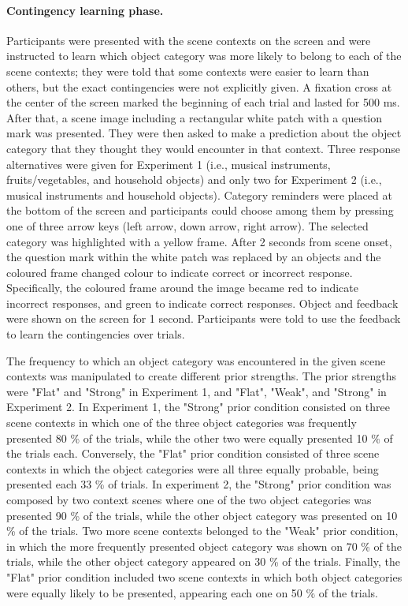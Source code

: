 \documentclass[a4paper,12pt]{article}
\begin{document}
\paragraph{Contingency learning phase.}
Participants were presented with the scene contexts on the screen and were instructed to learn which object category was more likely to belong to each of the scene contexts; they were told that some contexts were easier to learn than others, but the exact contingencies were not explicitly given. A fixation cross at the center of the screen marked the beginning of each trial and lasted for 500 ms. After that, a scene image including a rectangular white patch with a question mark was presented. They were then asked to make a prediction about the object category that they thought they would encounter in that context. Three response alternatives were given for Experiment 1 (i.e., musical instruments, fruits/vegetables, and household objects) and only two for Experiment 2 (i.e., musical instruments and household objects). Category reminders were placed at the bottom of the screen and participants could choose among them by pressing one of three arrow keys (left arrow, down arrow, right arrow). The selected category was highlighted with a yellow frame. After 2 seconds from scene onset, the question mark within the white patch was replaced by an objects and the coloured frame changed colour to indicate correct or incorrect response. Specifically, the coloured frame around the image became red to indicate incorrect responses, and green to indicate correct responses. Object and feedback were shown on the screen for 1 second. Participants were told to use the feedback to learn the contingencies over trials. \par
The frequency to which an object category was encountered in the given scene contexts was manipulated to create different prior strengths. The prior strengths were "Flat" and "Strong" in Experiment 1, and "Flat", "Weak", and "Strong" in Experiment 2. In Experiment 1, the "Strong" prior condition consisted on three scene contexts in which one of the three object categories was frequently presented 80 \% of the trials, while the other two were equally presented 10 \% of the trials each. Conversely, the "Flat" prior condition consisted of three scene contexts in which the object categories were all three equally probable, being presented each 33 \% of trials. 
In experiment 2, the "Strong" prior condition was composed by two context scenes where one of the two object categories was presented 90 \% of the trials, while the other object category was presented on 10 \% of the trials. Two more scene contexts belonged to the "Weak" prior condition, in which the more frequently presented object category was shown on 70 \% of the trials, while the other object category appeared on 30 \% of the trials. Finally, the "Flat" prior condition included two scene contexts in which both object categories were equally likely to be presented, appearing each one on 50 \% of the trials. 
\end{document}
